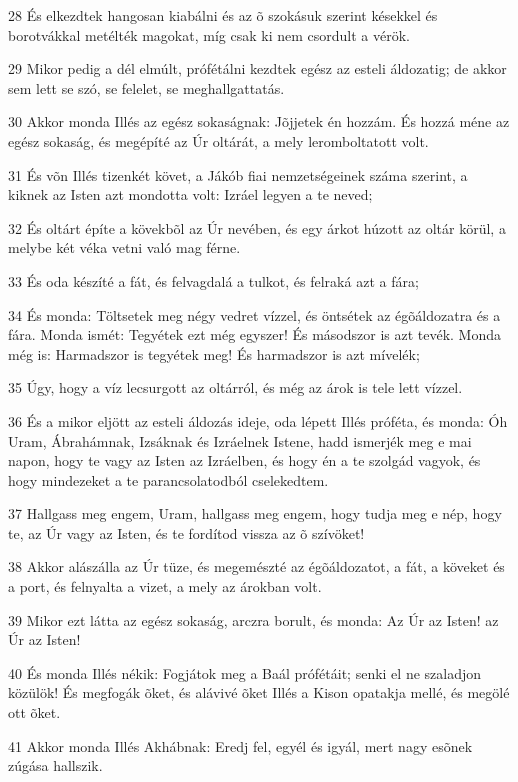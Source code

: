 \par 28 És elkezdtek hangosan kiabálni és az õ szokásuk szerint késekkel és borotvákkal metélték magokat, míg csak ki nem csordult a vérök.
\par 29 Mikor pedig a dél elmúlt, prófétálni kezdtek egész az esteli áldozatig; de akkor sem lett se szó, se felelet, se meghallgattatás.
\par 30 Akkor monda Illés az egész sokaságnak: Jõjjetek én hozzám. És hozzá méne az egész sokaság, és megépíté az Úr oltárát, a mely leromboltatott volt.
\par 31 És võn Illés tizenkét követ, a Jákób fiai nemzetségeinek száma szerint, a kiknek az Isten azt mondotta volt: Izráel legyen  a te neved;
\par 32 És oltárt építe a kövekbõl az Úr nevében, és egy árkot húzott az oltár körül, a melybe két véka vetni való mag férne.
\par 33 És oda készíté a fát, és felvagdalá a tulkot, és felraká azt a fára;
\par 34 És monda: Töltsetek meg négy vedret vízzel, és öntsétek az égõáldozatra és a fára. Monda ismét: Tegyétek ezt még egyszer! És másodszor is azt tevék. Monda még is: Harmadszor is tegyétek meg! És harmadszor is azt mívelék;
\par 35 Úgy, hogy a víz lecsurgott az oltárról, és még az árok is tele lett vízzel.
\par 36 És a mikor eljött az esteli áldozás ideje, oda lépett Illés próféta, és monda: Óh Uram, Ábrahámnak, Izsáknak és Izráelnek Istene, hadd ismerjék meg e mai napon, hogy te vagy az Isten az Izráelben, és hogy én a te szolgád vagyok, és hogy  mindezeket a te parancsolatodból cselekedtem.
\par 37 Hallgass meg engem, Uram, hallgass meg engem, hogy tudja meg e nép, hogy te, az Úr vagy az Isten, és te fordítod vissza az õ szívöket!
\par 38 Akkor alászálla az Úr tüze, és megemészté az égõáldozatot, a fát, a köveket és a port, és felnyalta a vizet, a mely az árokban volt.
\par 39 Mikor ezt látta az egész sokaság, arczra borult, és monda: Az Úr az Isten! az Úr az Isten!
\par 40 És monda Illés nékik: Fogjátok meg a Baál prófétáit; senki el ne szaladjon közülök! És megfogák õket, és alávivé õket Illés a Kison opatakja mellé, és megölé ott õket.
\par 41 Akkor monda Illés Akhábnak: Eredj fel, egyél és igyál, mert nagy esõnek zúgása hallszik.
